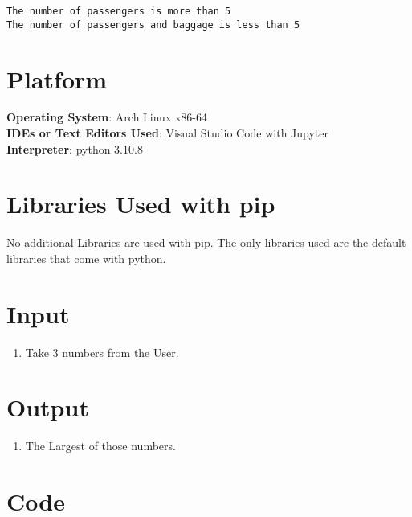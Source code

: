 \documentclass[11pt]{article}
\begin{document}
    \begin{Verbatim}[commandchars=\\\{\}]
The number of passengers is more than 5
The number of passengers and baggage is less than 5
    \end{Verbatim}

\section{Platform}
\textbf{Operating System}: Arch Linux x86-64 \\
\textbf{IDEs or Text Editors Used}: Visual Studio Code with Jupyter\\
\textbf{Interpreter}: python 3.10.8 \\

\section{Libraries Used with pip}
No additional Libraries are used with pip. The only libraries used are the default libraries that come with python.





\section{Input}
\begin{enumerate}
	\item Take 3 numbers from the User. 
\end{enumerate}
\section{Output}
\begin{enumerate}
	\item The Largest of those numbers. 
\end{enumerate}

\section{Code}
\end{document}
